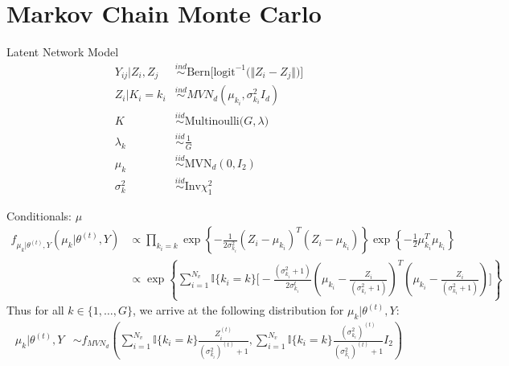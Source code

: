 \documentclass{beamer}
\begin{document}
%
%


\section{Markov Chain Monte Carlo}

\begin{frame}{Latent Network Model}
\begin{align*}
Y_{ij} | Z_i, Z_j &\overset{ind}\sim \text{Bern}\Big[\text{logit}^{-1}\big(\Vert Z_i - Z_j \Vert\big)\Big] \\
Z_i | K_i = k_i &\overset{ind}\sim MVN_d(\mu_{k_i}, \sigma_{k_i}^2 I_d) \\
K &\overset{iid}\sim \text{Multinoulli}\big(G, \lambda \big) \\
\lambda_k &\overset{iid}\sim \frac{1}{G} \\
\mu_k &\overset{iid}\sim \text{MVN}_d(0, I_2) \\
\sigma_k^2 &\overset{iid}\sim \text{Inv} \chi^2_1
\end{align*}
\end{frame}

\scriptsize
\begin{frame}{Conditionals: $\mu$}
\begin{align*}
f_{\mu_{k}|\theta^{(t)}, Y}(\mu_k|\theta^{(t)},Y) &\propto \prod_{k_i = k} \exp\left\{-\frac{1}{2\sigma_{k_i}^2}(Z_i - \mu_{k_i})^T(Z_i - \mu_{k_i})\right\}\exp\left\{-\frac{1}{2}\mu_{k_i}^T\mu_{k_i}\right\}\\
&\propto\exp\left\{\sum_{i = 1}^{N_v}\mathbb{I}\{k_i = k\} \Big[-\frac{(\sigma_{k_i}^2+1)}{2\sigma_{k_i}^t}\left(\mu_{k_i}-\frac{Z_i}{(\sigma_{k_i}^2+1)}\right)^T\left(\mu_{k_i}-\frac{Z_i}{(\sigma_{k_i}^2+1)}\right)\Big]\right\}
\end{align*}
Thus for all $k \in \{1, \ldots, G\}$, we arrive at the following distribution for $\mu_k | \theta^{(t)}, Y$:
\begin{align*}
\mu_{k}|\theta^{(t)},Y&\sim f_{{MVN}_d} \left(\sum_{i = 1}^{N_v}\mathbb{I}\{k_i = k\}\frac{Z_i^{(t)}}{(\sigma_{k_i}^2)^{(t)}+1}, \sum_{i = 1}^{N_v}\mathbb{I}\{k_i = k\}\frac{(\sigma_{k_i}^2)^{(t)}}{(\sigma_{k_i}^2)^{(t)}+1}I_2\right)\\
\end{align*}
\end{frame}
\end{document}
